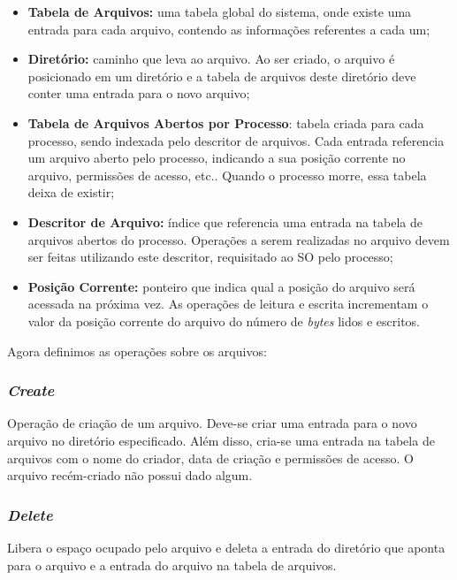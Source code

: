 \begin{itemize}
  \item \textbf{Tabela de Arquivos:} uma tabela global do sistema, onde existe uma entrada para cada arquivo, contendo as informações referentes a cada um;

  \item \textbf{Diretório:} caminho que leva ao arquivo. Ao ser criado, o arquivo é posicionado em um diretório e a tabela de arquivos deste diretório deve conter uma entrada para o novo arquivo;

  \item \textbf{Tabela de Arquivos Abertos por Processo}: tabela criada para cada processo, sendo indexada pelo descritor de arquivos. Cada entrada referencia um arquivo aberto pelo processo, indicando a sua posição corrente no arquivo, permissões de acesso, etc.. Quando o processo morre, essa tabela deixa de existir;

  \item \textbf{Descritor de Arquivo:} índice que referencia uma entrada na tabela de arquivos abertos do processo. Operações a serem realizadas no arquivo devem ser feitas utilizando este descritor, requisitado ao SO pelo processo;

  \item \textbf{Posição Corrente:} ponteiro que indica qual a posição do arquivo será acessada na próxima vez. As operações de leitura e escrita incrementam o valor da posição corrente do arquivo do número de \textit{bytes} lidos e escritos.
\end{itemize}

Agora definimos as operações sobre os arquivos:

\subsubsection{\textit{Create}}
Operação de criação de um arquivo. Deve-se criar uma entrada para o novo arquivo no diretório especificado. Além disso, cria-se uma entrada na tabela de arquivos com o nome do criador, data de criação e permissões de acesso. O arquivo recém-criado não possui dado algum.


\subsubsection{\textit{Delete}}
Libera o espaço ocupado pelo arquivo e deleta a entrada do diretório que aponta para o arquivo e a entrada do arquivo na tabela de arquivos.


